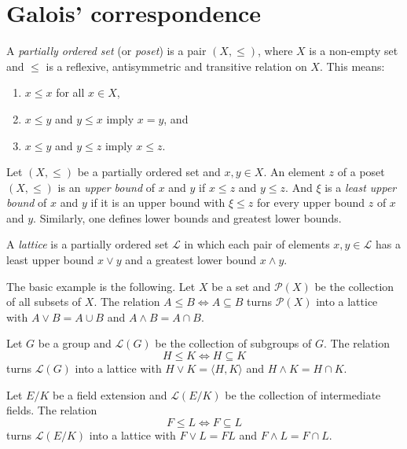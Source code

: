 \section{Galois' correspondence}
\lecture 

A \emph{partially ordered set} (or \emph{poset}) is a pair $(X,\leq)$, where $X$ is a non-empty set
and $\leq$ is a reflexive, antisymmetric and transitive relation on $X$. This means:
\begin{enumerate}
    \item $x\leq x$ for all $x\in X$, 
    \item $x\leq y$ and $y\leq x$ imply $x=y$, and 
    \item $x\leq y$ and $y\leq z$ imply $x\leq z$. 
\end{enumerate}
Let $(X,\leq)$ be a partially ordered set and $x,y\in X$. 
An element $z$ of a poset $(X,\leq)$ is an \emph{upper bound} of $x$ and $y$ if 
$x\leq z$ and $y\leq z$. And $\xi$ 
is a \emph{least upper bound} of $x$ and $y$ 
if it is an upper bound with $\xi\leq z$ for every upper bound $z$ of $x$ and $y$. 
Similarly, one defines lower bounds and greatest lower bounds. 

\begin{definition}
    A \emph{lattice} is a partially ordered set $\mathcal{L}$ in which 
    each pair of elements $x,y\in \mathcal{L}$ has a least upper bound $x\vee y$ and a
    greatest lower bound $x\wedge y$. 
\end{definition}

The basic example is the following. 
Let $X$ be a set and $\mathcal{P}(X)$ be the collection of all subsets of $X$. The relation 
$A\leq B\Longleftrightarrow A\subseteq B$
turns $\mathcal{P}(X)$ into a lattice 
with $A\vee B=A\cup B$ and $A\wedge B=A\cap B$. 

\begin{example}
    Let $G$ be a group and $\mathcal{L}(G)$ be the collection of subgroups of $G$. The relation
    \[ 
    H\leq K\Longleftrightarrow H\subseteq K
    \] 
    turns $\mathcal{L}(G)$ into a lattice 
    with $H\vee K=\langle H,K\rangle$ and 
    $H\wedge K=H\cap K$. 
\end{example}

\begin{example}
    Let $E/K$ be a field extension and $\mathcal{L}(E/K)$ be the collection of 
    intermediate fields. The relation
    \[
    F\leq L\Longleftrightarrow F\subseteq L
    \]
    turns $\mathcal{L}(E/K)$ into a lattice with 
    $F\vee L=FL$ and $F\wedge L=F\cap L$. 
\end{example}

